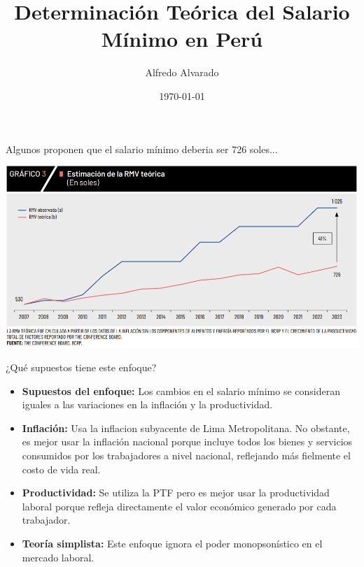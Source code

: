 \documentclass{beamer}
\title{Determinación Teórica del Salario Mínimo en Perú}
\author{Alfredo Alvarado}
\institute{Economista independiente}
\date{\today}
\begin{document}
\begin{frame}
    \titlepage
\end{frame}

\begin{frame}{Algunos proponen que el salario mínimo deberia ser 726 soles...}
    \begin{center}
        \includegraphics[width=\linewidth]{bcrp_salmin.PNG}
    \end{center}
\end{frame}


\begin{frame}{¿Qué supuestos tiene este enfoque?}
    \begin{itemize}
        \item \textbf{Supuestos del enfoque:} Los cambios en el salario mínimo se consideran iguales a las variaciones en la inflación y la productividad.
        \item \textbf{Inflación:} Usa la inflacion subyacente de Lima Metropolitana. No obstante, es mejor usar la inflación nacional porque incluye todos los bienes y servicios consumidos por los trabajadores a nivel nacional, reflejando más fielmente el costo de vida real.
        \item \textbf{Productividad:} Se utiliza la PTF pero es mejor usar la productividad laboral porque refleja directamente el valor económico generado por cada trabajador.
        \item \textbf{Teoría simplista:} Este enfoque ignora el poder monopsonístico en el mercado laboral.
    \end{itemize}
\end{frame}
\end{document}
